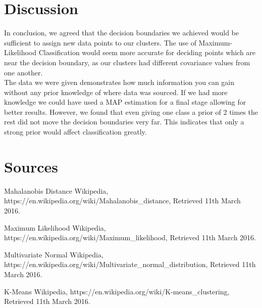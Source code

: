 \documentclass[11pt, a4paper]{article}
\begin{document}
\section{Discussion}
In conclusion, we agreed that the decision boundaries we achieved would be sufficient to assign new data points to our clusters. The use of Maximum-Likelihood Classification would seem more accurate for deciding points which are near the decision boundary, as our clusters had different covariance values from one another. \\
The data we were given demonstrates how much information you can gain without any prior knowledge of where data was sourced. If we had more knowledge we could have used a MAP estimation for a final stage allowing for better results. However, we found that even giving one class a prior of 2 times the rest did not move the decision boundaries very far. This indicates that only a strong prior would affect classification greatly.

\section{Sources}
\renewcommand{\refname}{\vspace{-2em}}
\begin{thebibliography}{9}

  Mahalanobis Distance Wikipedia,
  https://en.wikipedia.org/wiki/Mahalanobis\_distance,
  Retrieved 11th March 2016.
  
  Maximum Likelihood Wikipedia,
  https://en.wikipedia.org/wiki/Maximum\_likelihood,
  Retrieved 11th March 2016.
  
  Multivariate Normal Wikipedia,
  https://en.wikipedia.org/wiki/Multivariate\_normal\_distribution,
  Retrieved 11th March 2016.
  
  K-Means Wikipedia,
  https://en.wikipedia.org/wiki/K-means\_clustering,
  Retrieved 11th March 2016.

\end{thebibliography}
\end{document}
